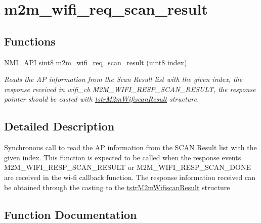 \hypertarget{group__WifiReqScanResult}{}\section{m2m\+\_\+wifi\+\_\+req\+\_\+scan\+\_\+result}
\label{group__WifiReqScanResult}
\subsection*{Functions}
\begin{DoxyCompactItemize}
\item 
\hyperlink{group__BSPDefine_gaecc0323d771e41ef81a76b5f12783e22}{N\+M\+I\+\_\+\+A\+PI} \hyperlink{group__DataT_gae35f10ffd0ac8dd2bc3e794da9bdfbc7}{sint8} \hyperlink{group__WifiReqScanResult_ga2585ee08ee8ecac67155ec99dd4d0863}{m2m\+\_\+wifi\+\_\+req\+\_\+scan\+\_\+result} (\hyperlink{group__DataT_ga4df709a77647e870bbf1d955b8edc9a6}{uint8} index)
\begin{DoxyCompactList}\small\item\em Reads the AP information from the Scan Result list with the given index, the response received in wifi\+\_\+cb M2\+M\+\_\+\+W\+I\+F\+I\+\_\+\+R\+E\+S\+P\+\_\+\+S\+C\+A\+N\+\_\+\+R\+E\+S\+U\+LT, the response pointer should be casted with \hyperlink{structtstrM2mWifiscanResult}{tstr\+M2m\+Wifiscan\+Result} structure. \end{DoxyCompactList}\end{DoxyCompactItemize}


\subsection{Detailed Description}
Synchronous call to read the AP information from the S\+C\+AN Result list with the given index. This function is expected to be called when the response events M2\+M\+\_\+\+W\+I\+F\+I\+\_\+\+R\+E\+S\+P\+\_\+\+S\+C\+A\+N\+\_\+\+R\+E\+S\+U\+LT or M2\+M\+\_\+\+W\+I\+F\+I\+\_\+\+R\+E\+S\+P\+\_\+\+S\+C\+A\+N\+\_\+\+D\+O\+NE are received in the wi-\/fi callback function. The response information received can be obtained through the casting to the \hyperlink{structtstrM2mWifiscanResult}{tstr\+M2m\+Wifiscan\+Result} structure 

\subsection{Function Documentation}
\mbox{\label{group__WifiReqScanResult_ga2585ee08ee8ecac67155ec99dd4d0863}} 
